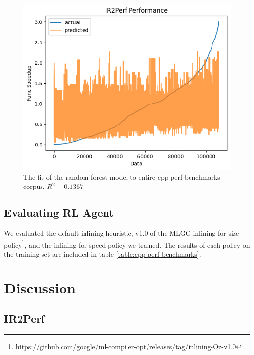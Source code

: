 \documentclass[nohyperref]{article}
\theoremstyle{plain}
\theoremstyle{definition}
\theoremstyle{remark}
\begin{document}
\begin{figure}[h!]
    \centerline{\includegraphics[width=\columnwidth]{ir2perf-fit}}
    \caption{The fit of the random forest model to entire cpp-perf-benchmarks corpus. $R^2 = 0.1367$}
    \label{fig:ir2perf-fit}
\end{figure}

\subsection{Evaluating RL Agent}
We evaluated the default inlining heuristic, v1.0 of the MLGO inlining-for-size policy\footnote{\href{https://github.com/google/ml-compiler-opt/releases/tag/inlining-Oz-v1.0}{https://github.com/google/ml-compiler-opt/releases/tag/inlining-Oz-v1.0}}, and the inlining-for-speed policy we trained. The results of each policy on the training set are included in table \ref{table:cpp-perf-benchmarks}. %


%


\section{Discussion}
\label{discussion}
\subsection{IR2Perf}
\end{document}
